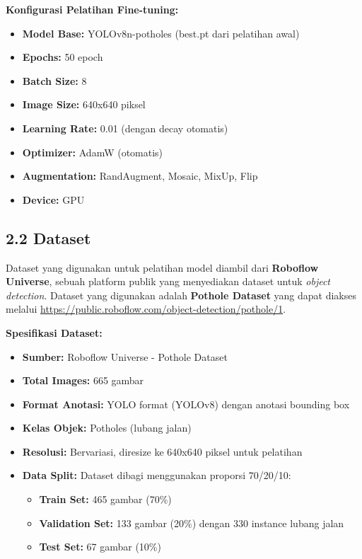 \documentclass[12pt,a4paper]{article}
\begin{document}
\textbf{Konfigurasi Pelatihan Fine-tuning:}
\begin{itemize}
    \item \textbf{Model Base:} YOLOv8n-potholes (best.pt dari pelatihan awal)
    \item \textbf{Epochs:} 50 epoch
    \item \textbf{Batch Size:} 8
    \item \textbf{Image Size:} 640x640 piksel
    \item \textbf{Learning Rate:} 0.01 (dengan decay otomatis)
    \item \textbf{Optimizer:} AdamW (otomatis)
    \item \textbf{Augmentation:} RandAugment, Mosaic, MixUp, Flip
    \item \textbf{Device:} GPU
\end{itemize}

\subsection*{2.2 Dataset}

Dataset yang digunakan untuk pelatihan model diambil dari \textbf{Roboflow Universe}, sebuah platform publik yang menyediakan dataset untuk \textit{object detection}. Dataset yang digunakan adalah \textbf{Pothole Dataset} yang dapat diakses melalui \url{https://public.roboflow.com/object-detection/pothole/1}.

\textbf{Spesifikasi Dataset:}
\begin{itemize}
    \item \textbf{Sumber:} Roboflow Universe - Pothole Dataset
    \item \textbf{Total Images:} 665 gambar
    \item \textbf{Format Anotasi:} YOLO format (YOLOv8) dengan anotasi bounding box
    \item \textbf{Kelas Objek:} Potholes (lubang jalan)
    \item \textbf{Resolusi:} Bervariasi, diresize ke 640x640 piksel untuk pelatihan
    \item \textbf{Data Split:} Dataset dibagi menggunakan proporsi 70/20/10:
    \begin{itemize}
        \item \textbf{Train Set:} 465 gambar (70\%)
        \item \textbf{Validation Set:} 133 gambar (20\%) dengan 330 instance lubang jalan
        \item \textbf{Test Set:} 67 gambar (10\%)
    \end{itemize}
\end{itemize}
\end{document}
